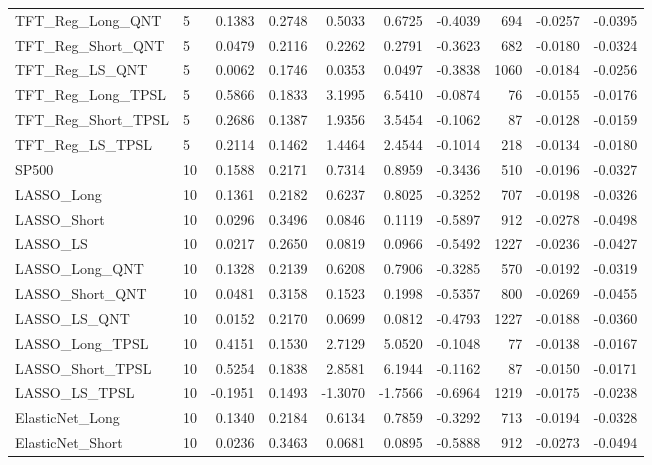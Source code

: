 \begin{tabular}{llrrrrrrrr}
\cline{1-10}
TFT\_Reg\_Long\_QNT & 5 & 0.1383 & 0.2748 & 0.5033 & 0.6725 & -0.4039 & 694 & -0.0257 & -0.0395 \\
\cline{1-10}
TFT\_Reg\_Short\_QNT & 5 & 0.0479 & 0.2116 & 0.2262 & 0.2791 & -0.3623 & 682 & -0.0180 & -0.0324 \\
\cline{1-10}
TFT\_Reg\_LS\_QNT & 5 & 0.0062 & 0.1746 & 0.0353 & 0.0497 & -0.3838 & 1060 & -0.0184 & -0.0256 \\
\cline{1-10}
TFT\_Reg\_Long\_TPSL & 5 & 0.5866 & 0.1833 & 3.1995 & 6.5410 & -0.0874 & 76 & -0.0155 & -0.0176 \\
\cline{1-10}
TFT\_Reg\_Short\_TPSL & 5 & 0.2686 & 0.1387 & 1.9356 & 3.5454 & -0.1062 & 87 & -0.0128 & -0.0159 \\
\cline{1-10}
TFT\_Reg\_LS\_TPSL & 5 & 0.2114 & 0.1462 & 1.4464 & 2.4544 & -0.1014 & 218 & -0.0134 & -0.0180 \\
\cline{1-10}
SP500 & 10 & 0.1588 & 0.2171 & 0.7314 & 0.8959 & -0.3436 & 510 & -0.0196 & -0.0327 \\
\cline{1-10}
LASSO\_Long & 10 & 0.1361 & 0.2182 & 0.6237 & 0.8025 & -0.3252 & 707 & -0.0198 & -0.0326 \\
\cline{1-10}
LASSO\_Short & 10 & 0.0296 & 0.3496 & 0.0846 & 0.1119 & -0.5897 & 912 & -0.0278 & -0.0498 \\
\cline{1-10}
LASSO\_LS & 10 & 0.0217 & 0.2650 & 0.0819 & 0.0966 & -0.5492 & 1227 & -0.0236 & -0.0427 \\
\cline{1-10}
LASSO\_Long\_QNT & 10 & 0.1328 & 0.2139 & 0.6208 & 0.7906 & -0.3285 & 570 & -0.0192 & -0.0319 \\
\cline{1-10}
LASSO\_Short\_QNT & 10 & 0.0481 & 0.3158 & 0.1523 & 0.1998 & -0.5357 & 800 & -0.0269 & -0.0455 \\
\cline{1-10}
LASSO\_LS\_QNT & 10 & 0.0152 & 0.2170 & 0.0699 & 0.0812 & -0.4793 & 1227 & -0.0188 & -0.0360 \\
\cline{1-10}
LASSO\_Long\_TPSL & 10 & 0.4151 & 0.1530 & 2.7129 & 5.0520 & -0.1048 & 77 & -0.0138 & -0.0167 \\
\cline{1-10}
LASSO\_Short\_TPSL & 10 & 0.5254 & 0.1838 & 2.8581 & 6.1944 & -0.1162 & 87 & -0.0150 & -0.0171 \\
\cline{1-10}
LASSO\_LS\_TPSL & 10 & -0.1951 & 0.1493 & -1.3070 & -1.7566 & -0.6964 & 1219 & -0.0175 & -0.0238 \\
\cline{1-10}
ElasticNet\_Long & 10 & 0.1340 & 0.2184 & 0.6134 & 0.7859 & -0.3292 & 713 & -0.0194 & -0.0328 \\
\cline{1-10}
ElasticNet\_Short & 10 & 0.0236 & 0.3463 & 0.0681 & 0.0895 & -0.5888 & 912 & -0.0273 & -0.0494 \\

\end{tabular}
